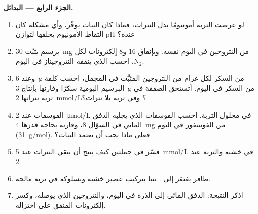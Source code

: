 \begin{problem}
\medskip
\noindent\textbf{الجزء الرابع --- البدائل.}
\begin{enumerate}[resume]
  \item لو عرضت التربة أمونيومًا بدل النترات، فماذا كان النبات
        يوفّر، وأي مشكلة كان التقاط الأمونيوم يخلقها لتوازن pH
        عنده؟
  \item برسيم يثبّت \qty{30}{mg} من النتروجين في اليوم نفسه.
        وبإنفاق \qty{16}{}  و\qty{8}{} إلكترونات لكل $\mathrm{N_2}$،
        احسب  الذي ينفقه النتروجيناز في اليوم.
  \item وعند \qty{6}{g} من السكر لكل غرام من النتروجين المثبَّت في
        المجمل، احسب كلفة البرسيم اليومية سكرًا وقارنها بإنتاج
        \qty{3}{g} من السكر في اليوم. أتستحق الصفقة في تربة نتراتها
        \qty{2}{mmol/L}؟ وفي تربة بلا نترات؟
  \item الفوسفات عند \qty{2}{\micro mol/L} في محلول التربة. احسب
        الفوسفات الذي يجلبه الدفق المائي في السؤال 8، وقارنه بحاجة
        قدرها \qty{4}{mg} من الفوسفور في اليوم
        (\qty{31}{g/mol}). فعلى ماذا يجب أن يعتمد النبات؟
  \item فسّر في جملتين كيف يتيح   أن يبقي النترات
        عند \qty{5}{mmol/L} في خشبه والتربة عند \qty{2}{}.
  \item طافر يفتقر إلى . تنبأ بتركيب عصير خشبه وبسلوكه
        في تربة مالحة.
  \item اذكر النتيجة: الدفق المائي إلى  الذرة في اليوم،
        والنتروجين الذي يوصله، وكسر إلكترونات  المنفق على
        اختزاله.
\end{enumerate}
\end{problem}
